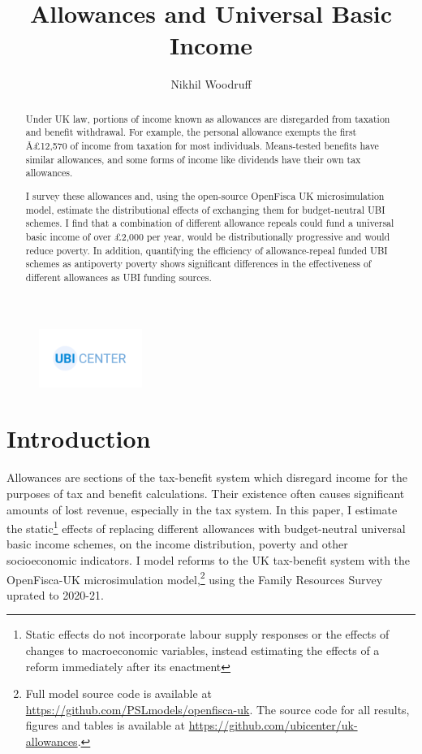 \documentclass{article}
\title{Allowances and Universal Basic Income}
\author[1]{Nikhil Woodruff}
\affil[1]{UBI Center}
\begin{document}
    \maketitle
    \begin{figure}[h]
        \href{http://www.ubicenter.org}{\includegraphics[width=0.3\textwidth]{images/ubicenter.png}}
        \centering
        \end{figure}
    \begin{abstract}
        Under UK law, portions of income known as allowances are disregarded from taxation and benefit withdrawal. For example, the personal allowance exempts the first Â£12,570 of income from taxation for most individuals. Means-tested benefits have similar allowances, and some forms of income like dividends have their own tax allowances.

        I survey these allowances and, using the open-source OpenFisca UK microsimulation model, estimate the distributional effects of exchanging them for budget-neutral UBI schemes. I find that a combination of different allowance repeals could fund a universal basic income of over £2,000 per year, would be distributionally progressive and would reduce poverty. In addition, quantifying the efficiency of allowance-repeal funded UBI schemes as antipoverty poverty shows significant differences in the effectiveness of different allowances as UBI funding sources.
    \end{abstract}
    \section{Introduction}
    Allowances are sections of the tax-benefit system which disregard income for the purposes of tax and benefit calculations. Their existence often causes significant amounts of lost revenue, especially in the tax system. In this paper, I estimate the static\footnote{Static effects do not incorporate labour supply responses or the effects of changes to macroeconomic variables, instead estimating the effects of a reform immediately after its enactment} effects of replacing different allowances with budget-neutral universal basic income schemes, on the income distribution, poverty and other socioeconomic indicators. I model reforms to the UK tax-benefit system with the OpenFisca-UK microsimulation model,\footnote{Full model source code is available at \href{https://github.com/PSLmodels/openfisca-uk}{https://github.com/PSLmodels/openfisca-uk}. The source code for all results, figures and tables is available at \href{https://github.com/ubicenter/uk-allowances}{https://github.com/ubicenter/uk-allowances}.} using the Family Resources Survey uprated to 2020-21. 
\end{document}
